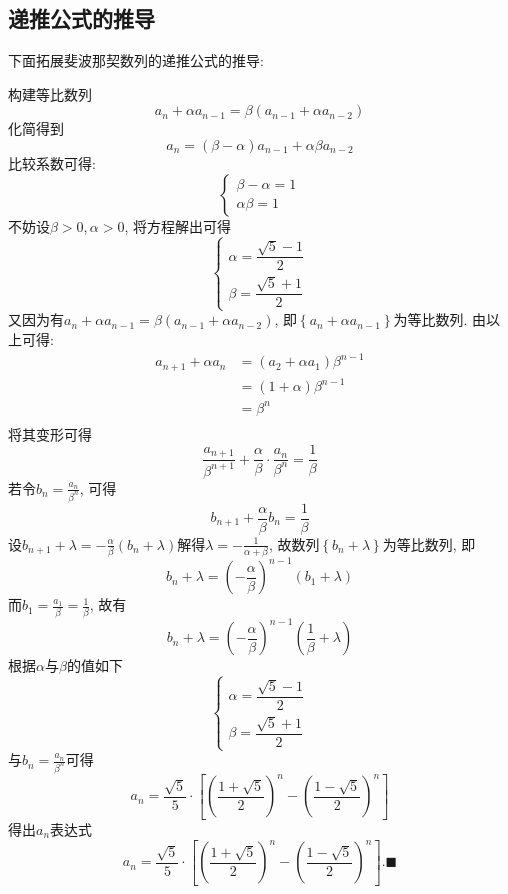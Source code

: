 \documentclass{book}
\begin{document}
    \subsection{递推公式的推导}
    下面拓展斐波那契数列的递推公式的推导:

    构建等比数列$${\displaystyle a_{n}+\alpha a_{n-1}=\beta (a_{n-1}+\alpha a_{n-2})}$$
    化简得到$${\displaystyle a_{n}=(\beta -\alpha )a_{n-1}+\alpha \beta a_{n-2}}$$
    比较系数可得:$${\displaystyle {\begin{cases}\beta -\alpha =1\\\alpha \beta =1\end{cases}}}$$
    不妨设${\displaystyle \beta >0,\alpha >0}$, 将方程解出可得$${\displaystyle {\begin{cases}\alpha ={\dfrac {{\sqrt {5}}-1}{2}}\\\beta ={\dfrac {{\sqrt {5}}+1}{2}}\end{cases}}}$$
    又因为有${\displaystyle a_{n}+\alpha a_{n-1}=\beta (a_{n-1}+\alpha a_{n-2})}$, 即${\displaystyle \left\{a_{n}+\alpha a_{n-1}\right\}}$为等比数列.
    由以上可得:$${\displaystyle {\begin{aligned}a_{n+1}+\alpha a_{n}&=(a_{2}+\alpha a_{1})\beta ^{n-1}\\&=(1+\alpha )\beta ^{n-1}\\&=\beta ^{n}\\\end{aligned}}}$$
    将其变形可得$${\displaystyle {\frac {a_{n+1}}{\beta ^{n+1}}}+{\frac {\alpha }{\beta }}\cdot {\frac {a_{n}}{\beta ^{n}}}={\frac {1}{\beta }}}$$
    若令${\displaystyle b_{n}={\frac {a_{n}}{\beta ^{n}}}}$, 可得$${\displaystyle b_{n+1}+{\frac {\alpha }{\beta }}b_{n}={\frac {1}{\beta }}}$$
    设${\displaystyle b_{n+1}+\lambda =-{\frac {\alpha }{\beta }}(b_{n}+\lambda )}$解得${\displaystyle \lambda =-{\frac {1}{\alpha +\beta }}}$, 故数列${\displaystyle \left\{b_{n}+\lambda \right\}}$为等比数列, 即$${\displaystyle b_{n}+\lambda =\left(-{\frac {\alpha }{\beta }}\right)^{n-1}\left(b_{1}+\lambda \right)}$$
    而${\displaystyle b_{1}={\frac {a_{1}}{\beta }}={\frac {1}{\beta }}}$, 故有$${\displaystyle b_{n}+\lambda =\left(-{\frac {\alpha }{\beta }}\right)^{n-1}\left({\frac {1}{\beta }}+\lambda \right)}$$
    根据$\alpha$与$\beta$的值如下 $${\displaystyle {\begin{cases}\alpha ={\dfrac {{\sqrt {5}}-1}{2}}\\\beta ={\dfrac {{\sqrt {5}}+1}{2}}\end{cases}}} $$
    与${\displaystyle b_{n}={\frac {a_{n}}{\beta ^{n}}}}$可得$${\displaystyle a_{n}={\frac {\sqrt {5}}{5}}\cdot \left[\left({\frac {1+{\sqrt {5}}}{2}}\right)^{n}-\left({\frac {1-{\sqrt {5}}}{2}}\right)^{n}\right]}$$得出$    {\displaystyle {a_{n}}}$表达式$${\displaystyle a_{n}={\frac {\sqrt {5}}{5}}\cdot \left[\left({\frac {1+{\sqrt {5}}}{2}}\right)^{n}-\left({\frac {1-{\sqrt {5}}}{2}}\right)^{n}\right]}.\blacksquare$$ \cite{Fibonacci}
\end{document}
